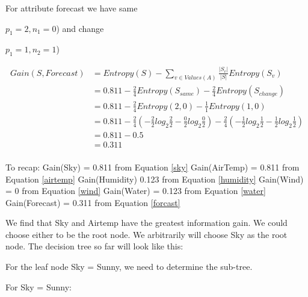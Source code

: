 \documentclass[10pt,a4paper]{article}
\begin{document}
{{{{{{{{For attribute forecast we have same {$p_1=2,n_1=0$) and change {$p_1=1,n_2=1$)

\begin{equation}
\begin{split}
\label{forcast}
Gain(S,Forecast) &= Entropy(S) - \sum_{v \in Values(A)} \frac{\vert S_v\vert}{\vert S\vert}Entropy(S_v) \\
          &= 0.811 - \frac{2}{4} Entropy(S_{same} ) - \frac{2}{4}Entropy(S_{change}) \\
          &= 0.811 - \frac{2}{4} Entropy(2,0) - \frac{1}{1}Entropy(1,0) \\
          &= 0.811 -\frac{2}{4} ( -\frac{2}{2} log_2\frac{2}{2} -\frac{0}{2} log_2\frac{0}{2} ) - \frac{2}{4}(-\frac{1}{2} log_2\frac{1}{2} - \frac{1}{2}log_2\frac{1}{2} ) \\
          &= 0.811 - 0.5\\
          &= 0.311 \\
\end{split}
\end{equation}

To recap: 
\newline
Gain(Sky) = 0.811 from Equation \ref{sky} \newline
Gain(AirTemp) = 0.811 from Equation \ref{airtemp} \newline
Gain(Humidity) 0.123 from Equation \ref{humidity} \newline
Gain(Wind) = 0 from Equation \ref{wind} \newline
Gain(Water) = 0.123 from Equation \ref{water} \newline
Gain(Forecast) = 0.311 from Equation \ref{forcast} \newline

We find that Sky and Airtemp have the greatest information gain. We could choose either to be the root node. We arbitrarily will choose Sky as the root node. The decision tree so far will look like this:



For the leaf node Sky = Sunny, we need to determine the sub-tree.

For Sky = Sunny:

}}}}}}}}}}
\end{document}
